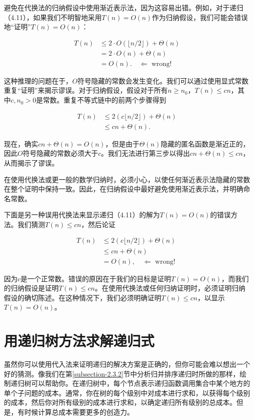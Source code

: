 \documentclass[lang=cn,newtx,10pt,scheme=chinese]{elegantbook}
\begin{document}
避免在代换法的归纳假设中使用渐近表示法，因为这容易出错。例如，对于递归（4.11），如果我们不明智地采用$T(n)=O(n)$作为归纳假设，我们可能会错误地“证明”$T(n)=O(n)$：

$$
\begin{aligned}
T(n) & \leq 2 \cdot O(\lfloor n / 2\rfloor)+\Theta(n) \\
& =2 \cdot O(n)+\Theta(n) \\
& =O(n) . \quad \Longleftarrow \text { wrong! }
\end{aligned}
$$

这种推理的问题在于，$O$符号隐藏的常数会发生变化。我们可以通过使用显式常数重复“证明”来揭示谬误。对于归纳假设，假设对于所有$n \geq n_0$，$T(n) \leq c n$，其中$c, n_0>0$是常数。重复不等式链中的前两个步骤得到

$$
\begin{aligned}
T(n) & \leq 2(c\lfloor n / 2\rfloor)+\Theta(n) \\
& \leq c n+\Theta(n) .
\end{aligned}
$$

现在，确实$c n+\Theta(n)=O(n)$，但是由于$\Theta(n)$隐藏的匿名函数是渐近正的，因此$O$符号隐藏的常数必须大于$c$。我们无法进行第三步以得出$c n+\Theta(n) \leq c n$，从而揭示了谬误。

在使用代换法或更一般的数学归纳时，必须小心，以使任何渐近表示法隐藏的常数在整个证明中保持一致。因此，在归纳假设中最好避免使用渐近表示法，并明确命名常数。

下面是另一种误用代换法来显示递归（4.11）的解为$T(n)=O(n)$的错误方法。我们猜测$T(n) \leq c n$，然后论证

$$
\begin{aligned}
T(n) & \leq 2(c\lfloor n / 2\rfloor)+\Theta(n) \\
& \leq c n+\Theta(n) \\
& =O(n), \quad \Longleftarrow \text { wrong! }
\end{aligned}
$$

因为$c$是一个正常数。错误的原因在于我们的目标是证明$T(n)=O(n)$，而我们的归纳假设是证明$T(n) \leq c n$。在使用代换法或任何归纳证明时，必须证明归纳假设的确切陈述。在这种情况下，我们必须明确证明$T(n) \leq c n$，以显示$T(n)=O(n)$。

\section{用递归树方法求解递归式}\label{section-4.4}

虽然你可以使用代入法来证明递归的解决方案是正确的，但你可能会难以想出一个好的猜测。像我们在第\ref{subsection-2.3.2}节中分析归并排序递归时所做的那样，绘制递归树可以帮助你。在递归树中，每个节点表示递归函数调用集合中某个地方的单个子问题的成本。通常，你在树的每个级别中对成本进行求和，以获得每个级别的成本，然后你对所有级别的成本进行求和，以确定递归所有级别的总成本。但是，有时候计算总成本需要更多的创造力。
\end{document}
